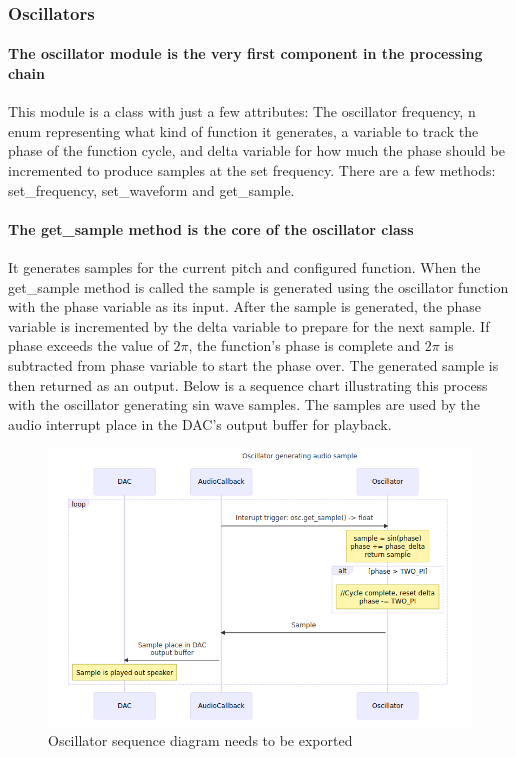 \documentclass[acmlarge,screen]{acmart}
\begin{document}
	\subsubsection{Oscillators}
	\paragraph{The oscillator module is the very first component in the processing chain} This module is a class with just a few attributes: The oscillator frequency, n enum representing what kind of function it generates, a variable to track the phase of the function cycle, and delta variable for how much the phase should be incremented to produce samples at the set frequency. There are a few methods: set\_frequency, set\_waveform and get\_sample. 
		
	\paragraph{The get\_sample method is the core of the oscillator class} It generates samples for the current pitch and configured function. When the get\_sample method is called the sample is generated using the oscillator function with the phase variable as its input. After the sample is generated, the phase variable is incremented by the delta variable to prepare for the next sample. If phase exceeds the value of \( 2\pi \), the function's phase is complete and \( 2\pi \) is subtracted from phase variable to start the phase over. The generated sample is then returned as an output. Below is a sequence chart illustrating this process with the oscillator generating sin wave samples. The samples are used by the audio interrupt place in the DAC's output buffer for playback.\cite{farnell_2010}
	
	\begin{figure}
		\includegraphics[width=\linewidth]{oscillator_sequence_diagram}
		\caption{Oscillator sequence diagram needs to be exported}
		\centering
	\end{figure}
	
\end{document}
